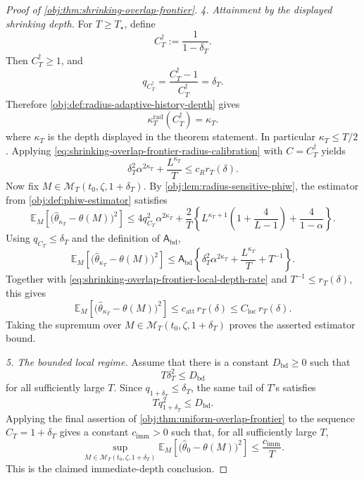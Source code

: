 \documentclass[11pt]{article}
\begin{document}
\begin{proof}[Proof of \cref{obj:thm:shrinking-overlap-frontier}]
\emph{4. Attainment by the displayed shrinking depth.}
For \(T\ge T_\star\), define
\[
C_T^\dagger:=\frac{1}{1-\delta_T}.
\]
Then \(C_T^\dagger\ge1\), and
\[
q_{C_T^\dagger}
=
\frac{C_T^\dagger-1}{C_T^\dagger}
=
\delta_T .
\]
Therefore \cref{obj:def:radius-adaptive-history-depth} gives
\begin{equation}\label{eq:shrinking-overlap-frontier-depth-identity}
\kappa_T^{\mathrm{rad}}(C_T^\dagger)=\kappa_T.
\end{equation}
where \(\kappa_T\) is the depth displayed in the theorem statement.  In
particular \(\kappa_T\le T/2\).  Applying \cref{eq:shrinking-overlap-frontier-radius-calibration} with \(C=C_T^\dagger\) yields
\begin{equation}\label{eq:shrinking-overlap-frontier-local-depth-rate}
\delta_T^2\alpha^{2\kappa_T}
+\frac{L^{\kappa_T}}{T}
\le
c_R r_T(\delta).
\end{equation}
Now fix \(M\in\mathcal M_T(t_0,\zeta,1+\delta_T)\).  By
\cref{obj:lem:radius-sensitive-phiw}, the estimator from
\cref{obj:def:phiw-estimator} satisfies
\[
\mathbb E_M\!\left[
\bigl(\widehat\theta_{\kappa_T}-\theta(M)\bigr)^2
\right]
\le
4q_{C_T}^2\alpha^{2\kappa_T}
+\frac{2}{T}
\left\{
L^{\kappa_T+1}\left(1+\frac{4}{L-1}\right)
+\frac{4}{1-\alpha}
\right\}.
\]
Using \(q_{C_T}\le\delta_T\) and the definition of
\(\mathsf A_{\mathrm{bd}}\),
\[
\mathbb E_M\!\left[
\bigl(\widehat\theta_{\kappa_T}-\theta(M)\bigr)^2
\right]
\le
\mathsf A_{\mathrm{bd}}
\left\{
\delta_T^2\alpha^{2\kappa_T}
+\frac{L^{\kappa_T}}{T}
+T^{-1}
\right\}.
\]
Together with \cref{eq:shrinking-overlap-frontier-local-depth-rate} and \(T^{-1}\le r_T(\delta)\), this gives
\[
\mathbb E_M\!\left[
\bigl(\widehat\theta_{\kappa_T}-\theta(M)\bigr)^2
\right]
\le
c_{\mathrm{att}}\,r_T(\delta)
\le
C_{\mathrm{loc}}\,r_T(\delta).
\]
Taking the supremum over
\(M\in\mathcal M_T(t_0,\zeta,1+\delta_T)\) proves the asserted estimator
bound. %

\emph{5. The bounded local regime.}
Assume that there is a constant \(D_{\mathrm{bd}}\ge0\) such that
\[
T\delta_T^2\le D_{\mathrm{bd}}
\]
for all sufficiently large \(T\).  Since \(q_{1+\delta_T}\le\delta_T\), the
same tail of \(T\)'s satisfies
\[
Tq_{1+\delta_T}^2\le D_{\mathrm{bd}}.
\]
Applying the final assertion of \cref{obj:thm:uniform-overlap-frontier} to
the sequence \(C_T=1+\delta_T\) gives a constant \(c_{\mathrm{imm}}>0\) such
that, for all sufficiently large \(T\),
\[
\sup_{M\in\mathcal M_T(t_0,\zeta,1+\delta_T)}
\mathbb E_M\!\left[
\bigl(\widehat\theta_0-\theta(M)\bigr)^2
\right]
\le
\frac{c_{\mathrm{imm}}}{T}.
\]
This is the claimed immediate-depth conclusion. %
\end{proof}
\end{document}
